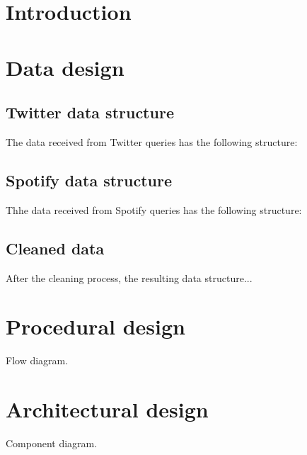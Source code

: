 
\section{Introduction}

\section{Data design}

\subsection{Twitter data structure}
\nonzeroparskip The data received from Twitter queries has the following structure:

\subsection{Spotify data structure}
\nonzeroparskip Thhe data received from Spotify queries has the following structure:

\subsection{Cleaned data}
\nonzeroparskip After the cleaning process, the resulting data structure...

\section{Procedural design}
\nonzeroparskip Flow diagram.

\section{Architectural design}
\nonzeroparskip Component diagram.